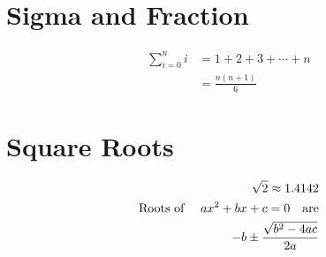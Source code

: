 \documentclass[17pt]{extarticle}
\begin{document}
\section{Sigma and Fraction}

\begin{align}
\sum_{i=0}^n i &= 1+2+3+ \cdots +n \\
			   &=\frac{n(n+1)}{6}
\end{align}
\section{Square Roots}

\begin{align}
\sqrt{2} \approx 1.4142\\
\text{Roots of \quad} ax^2 + bx + c = 0 \text{\quad are}\\
-b \pm \frac{\sqrt{b^2 -4ac}}{2a}
\end{align}
\end{document}
